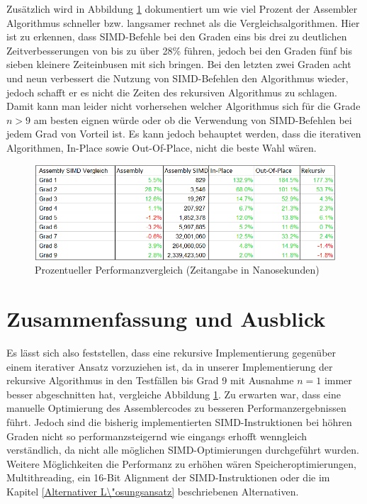 \documentclass[course=asp]{aspdoc}
\begin{document}
Zus\"atzlich wird in Abbildung \ref{Abb: Tabelle Performanz} dokumentiert um wie viel Prozent der Assembler Algorithmus schneller bzw. langsamer rechnet als die Vergleichsalgorithmen. Hier ist zu erkennen, dass SIMD-Befehle bei den Graden eins bis drei zu deutlichen Zeitverbesserungen von bis zu \"uber 28\% f\"uhren, jedoch bei den Graden f\"unf bis sieben kleinere Zeiteinbusen mit sich bringen. Bei den letzten zwei Graden acht und neun verbessert die Nutzung von SIMD-Befehlen den Algorithmus wieder, jedoch schafft er es nicht die Zeiten des rekursiven Algorithmus zu schlagen.
Damit kann man leider nicht vorhersehen welcher Algorithmus sich f\"ur die Grade $n > 9$ am besten eignen w\"urde oder ob die Verwendung von SIMD-Befehlen bei jedem Grad von Vorteil ist. Es kann jedoch behauptet werden, dass die iterativen Algorithmen, In-Place sowie Out-Of-Place, nicht die beste Wahl w\"aren.

\begin{figure}[ht]
\centering
\includegraphics[scale = 0.65]{zeitmessungenProzent.png}
\caption{Prozentueller Performanzvergleich (Zeitangabe in Nanosekunden)}\label{Abb: Tabelle Performanz}
\captionsetup[figure]{font=small,labelfont=small}
\end{figure}

\newpage
\section{Zusammenfassung und Ausblick} \label{Zusammenfassung und Ausblick}
Es l\"asst sich also feststellen, dass eine rekursive Implementierung gegen\"uber einem iterativer Ansatz vorzuziehen ist, da in unserer Implementierung der rekursive Algorithmus in den Testf\"allen bis Grad 9 mit Ausnahme $n = 1$ immer besser abgeschnitten hat, vergleiche Abbildung \ref{Abb: Tabelle Performanz}. Zu erwarten war, dass eine manuelle Optimierung des Assemblercodes zu besseren Performanzergebnissen f\"uhrt. Jedoch sind die bisherig implementierten SIMD-Instruktionen bei h\"ohren Graden nicht so performanzsteigernd wie eingangs erhofft wenngleich verst\"andlich, da nicht alle m\"oglichen SIMD-Optimierungen durchgef\"uhrt wurden. Weitere M\"oglichkeiten die Performanz zu erh\"ohen w\"aren Speicheroptimierungen, Multithreading, ein 16-Bit Alignment der SIMD-Instruktionen oder die im Kapitel \ref{Alternativer L\"osungsansatz} beschriebenen Alternativen.
\end{document}

